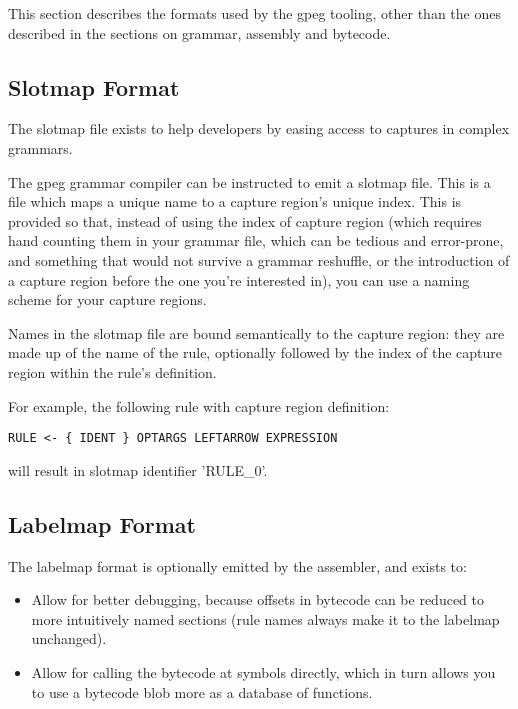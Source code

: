 This section describes the formats used by the gpeg tooling, other than
the ones described in the sections on grammar, assembly and bytecode.

\subsection{Slotmap Format}

The slotmap file exists to help developers by easing access to
captures in complex grammars.

The gpeg grammar compiler can be instructed to emit a slotmap file.
This is a file which maps a unique name to a capture region's unique index.
This is provided so that, instead of using the index of capture region
(which requires hand counting them in your grammar file, which can be
tedious and error-prone, and something that would not survive
a grammar reshuffle, or the introduction of a capture region before
the one you're interested in), you can use a naming scheme for your
capture regions.

Names in the slotmap file are bound semantically to the capture region:
they are made up of the name of the rule, optionally followed by the
index of the capture region within the rule's definition.

For example, the following rule with capture region definition:

\begin{myquote}
\begin{verbatim}
RULE <- { IDENT } OPTARGS LEFTARROW EXPRESSION
\end{verbatim}
\end{myquote}

will result in slotmap identifier 'RULE\_0'.

\subsection{Labelmap Format}

The labelmap format is optionally emitted by the assembler, and exists to:

\begin{itemize}
\item Allow for better debugging, because offsets in bytecode can be reduced
      to more intuitively named sections (rule names always make it to
      the labelmap unchanged).
\item Allow for calling the bytecode at symbols directly, which in turn
      allows you to use a bytecode blob more as a database of functions.
\end{itemize}

